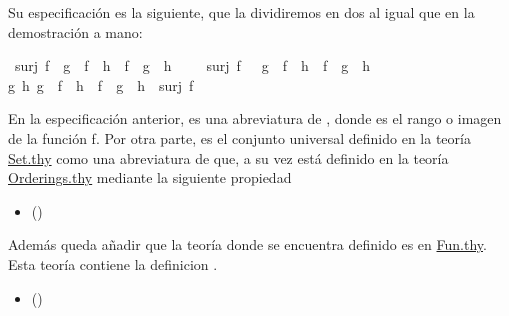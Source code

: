 \begin{isabellebody}
\begin{isamarkuptext}
Su especificación es la siguiente, que la dividiremos en dos al igual que 
en la demostración a mano:%
\end{isamarkuptext}\isamarkuptrue%
\isamarkupfalse%
\isanewline
\ {\isachardoublequoteopen}surj\ f\ {\isasymlongleftrightarrow}\ {\isacharparenleft}g\ {\isasymcirc}\ f\ {\isacharequal}\ h\ {\isasymcirc}\ f{\isacharparenright}\ {\isacharequal}\ {\isacharparenleft}g\ {\isacharequal}\ h{\isacharparenright}{\isachardoublequoteclose}\isanewline
%
\isadelimproof
\ \ %
\endisadelimproof
%
\isatagproof
{}\isamarkupfalse%
%
\endisatagproof
{\isafoldproof}%
%
\isadelimproof
\isanewline
%
\endisadelimproof
\isanewline
{}\isamarkupfalse%
\ \isanewline
{\isachardoublequoteopen}surj\ f\ {\isasymLongrightarrow}\ \ {\isacharparenleft}g\ {\isasymcirc}\ f\ {\isacharequal}\ h\ {\isasymcirc}\ f{\isacharparenright}\ {\isacharequal}\ {\isacharparenleft}g\ {\isacharequal}\ h{\isacharparenright}{\isachardoublequoteclose}\isanewline
%
\isadelimproof
\ \ %
\endisadelimproof
%
\isatagproof
{}\isamarkupfalse%
%
\endisatagproof
{\isafoldproof}%
%
\isadelimproof
\isanewline
%
\endisadelimproof
\isanewline
{}\isamarkupfalse%
\ \isanewline
{\isachardoublequoteopen}{\isasymforall}g\ h{\isachardot}\ {\isacharparenleft}g\ {\isasymcirc}\ f\ {\isacharequal}\ h\ {\isasymcirc}\ f\ {\isasymlongrightarrow}\ g\ {\isacharequal}\ h{\isacharparenright}\ {\isasymlongrightarrow}\ surj\ f{\isachardoublequoteclose}\isanewline
%
\isadelimproof
\ \ %
\endisadelimproof
%
\isatagproof
{}\isamarkupfalse%
%
\endisatagproof
{\isafoldproof}%
%
\isadelimproof
%
\endisadelimproof
%
\begin{isamarkuptext}%
En la especificación anterior,  es una abreviatura de 
  , donde  es el rango o imagen
de la función f.
 Por otra parte,  es el conjunto universal definido en la 
  teoría \href{http://bit.ly/2XtHCW6}{Set.thy} como una abreviatura de 
   que, a su vez está definido en la teoría 
  \href{http://bit.ly/2Xyj9Pe}{Orderings.thy} mediante la siguiente
  propiedad 
  \begin{itemize}
    \item[]  
      \hfill ()
  \end{itemize} 
Además queda añadir que la teoría donde se encuentra definido 
 es en \href{http://bit.ly/2XuPQx5}{Fun.thy}. Esta teoría contiene la
 definicion .
 \begin{itemize}
    \item[]  \hfill ()
  \end{itemize} 


\end{isamarkuptext}
\end{isabellebody}
